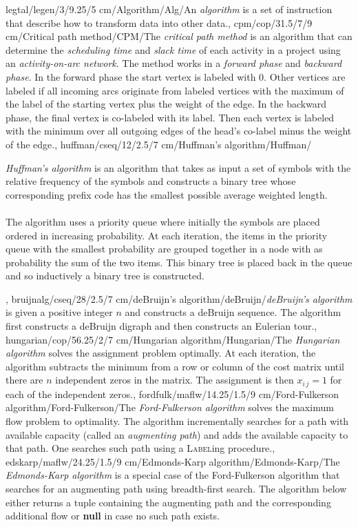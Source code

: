legtal/legen/3/9.25/5 cm/Algorithm/Alg/{An \emph{algorithm} is a set of instruction that describe how to transform data into other data.},
cpm/cop/31.5/7/9 cm/{Critical path method}/{CPM}/{The \emph{critical path method} is an algorithm that can determine the \emph{scheduling time} and \emph{slack time} of each activity in a project using an \emph{activity-on-arc network}. The method works in a \emph{forward phase} and \emph{backward phase}. In the forward phase the start vertex is labeled with $0$. Other vertices are labeled if all incoming arcs originate from labeled vertices with the maximum of the label of the starting vertex plus the weight of the edge. In the backward phase, the final vertex is co-labeled with its label. Then each vertex is labeled with the minimum over all outgoing edges of the head's co-label minus the weight of the edge.},
huffman/cseq/12/2.5/7 cm/{Huffman's algorithm}/{Huffman}/{\emph{Huffman's algorithm} is an algorithm that takes as input a set of symbols with the relative frequency of the symbols and constructs a binary tree whose corresponding prefix code has the smallest possible average weighted length.\paragraph{}The algorithm uses a priority queue where initially the symbols are placed ordered in increasing probability. At each iteration, the items in the priority queue with the smallest probability are grouped together in a node with as probability the sum of the two items. This binary tree is placed back in the queue and so inductively a binary tree is constructed.},
bruijnalg/cseq/28/2.5/7 cm/{deBruijn's algorithm}/{deBruijn}/{\emph{deBruijn's algorithm} is given a positive integer $n$ and constructs a deBruijn sequence. The algorithm first constructs a deBruijn digraph and then constructs an Eulerian tour.},
hungarian/cop/56.25/2/7 cm/{Hungarian algorithm}/{Hungarian}/{The \emph{Hungarian algorithm} solves the assignment problem optimally. At each iteration, the algorithm subtracts the minimum from a row or column of the cost matrix until there are $n$ independent zeros in the matrix. The assignment is then $x_{i\,j}=1$ for each of the independent zeros.},
fordfulk/maflw/14.25/1.5/9 cm/{Ford-Fulkerson algorithm}/{Ford-Fulkerson}/{The \emph{Ford-Fulkerson algorithm} solves the maximum flow problem to optimality. The algorithm incrementally searches for a path with available capacity (called an \emph{augmenting path}) and adds the available capacity to that path. One searches such path using a \textsc{Label}ing procedure.},
edskarp/maflw/24.25/1.5/9 cm/{Edmonds-Karp algorithm}/{Edmonds-Karp}/{The \emph{Edmonds-Karp algorithm} is a special case of the Ford-Fulkerson algorithm that searches for an augmenting path using breadth-first search. The algorithm below either returns a tuple containing the augmenting path and the corresponding additional flow or \textbf{null} in case no such path exists.}
